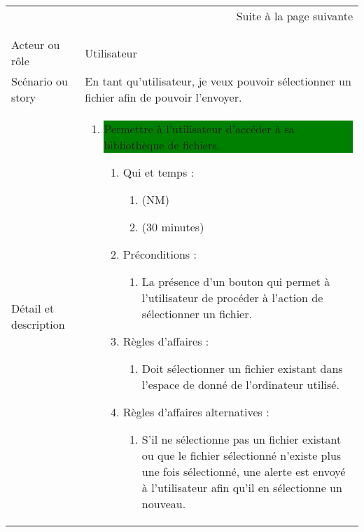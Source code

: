 \begin{longtable}{|l|p{}|}
\multicolumn{2}{r}{Suite à la page suivante} \\
\endfoot

\multicolumn{2}{r}{} \\
\endlastfoot

\hline
    \rowcolor{Gray}
    \multicolumn{2}{|l|}{1} \\
\hline
    Acteur ou rôle & Utilisateur \\
\hline
    Scénario ou story & En tant qu'utilisateur, 
      je veux pouvoir sélectionner un fichier
      afin de pouvoir l'envoyer. \\
\hline
    Détail et description &
        \begin{enumerate}[label*=\arabic*.]
            \item \colorbox{Green}{\parbox{13cm}{Permettre à l’utilisateur d’accéder à sa bibliothèque de fichiers.}}
            \begin{enumerate}[label*=\arabic*.]
                    \item Qui et temps :
                    \begin{enumerate}[label*=\arabic*.]
                        \item (NM)
                        \item (30 minutes)
                    \end{enumerate}
                    \item Préconditions : 
                    \begin{enumerate}[label*=\arabic*.]
                        \item La présence d'un bouton qui permet à l'utilisateur de procéder à l'action de sélectionner un fichier.
                    \end{enumerate}
                    \item Règles d’affaires :
                    \begin{enumerate}[label*=\arabic*.]
                        \item Doit sélectionner un fichier existant dans l'espace de donné de l'ordinateur utilisé.
                    \end{enumerate}
                    \item Règles d’affaires alternatives :
                    \begin{enumerate}[label*=\arabic*.]
                        \item S'il ne sélectionne pas un fichier existant ou que le fichier sélectionné n'existe plus une fois sélectionné, une alerte est envoyé à l'utilisateur afin qu'il en sélectionne un nouveau.

\end{enumerate}
\end{enumerate}
\end{enumerate}
\end{longtable}
